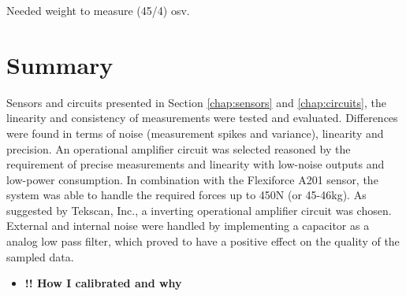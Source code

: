 Needed weight to measure (45/4) osv.

\section{Summary}
\label{sec:circuitsummary}
Sensors and circuits presented in Section \ref{chap:sensors} and \ref{chap:circuits}, the linearity and consistency of measurements were tested and evaluated. Differences were found in terms of noise (measurement spikes and variance), linearity and precision. An operational amplifier circuit was selected reasoned by the requirement of precise measurements and linearity with low-noise outputs and low-power consumption. In combination with the Flexiforce A201 sensor, the system was able to handle the required forces up to 450\si{\newton} (or 45-46\si{\kilogram}). As suggested by Tekscan, Inc., a inverting operational amplifier circuit was chosen.
External and internal noise were handled by implementing a capacitor as a analog low pass filter, which proved to have a positive effect on the quality of the sampled data.
\begin{itemize}
    \item \textbf{!! How I calibrated and why}
\end{itemize}

